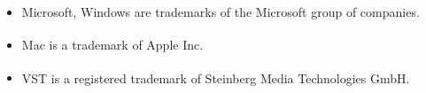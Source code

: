 \documentclass[12pt]{article}
\begin{document}
\begin{itemize}
    \item Microsoft\textsuperscript{\textregistered}, Windows\textsuperscript{\textregistered}
    are trademarks of the Microsoft group of companies.
    \item Mac\textsuperscript{\textregistered} is a trademark of Apple Inc.
    \item VST\textsuperscript{\textregistered} is a registered trademark of Steinberg Media
    Technologies GmbH.
\end{itemize}
\end{document}
